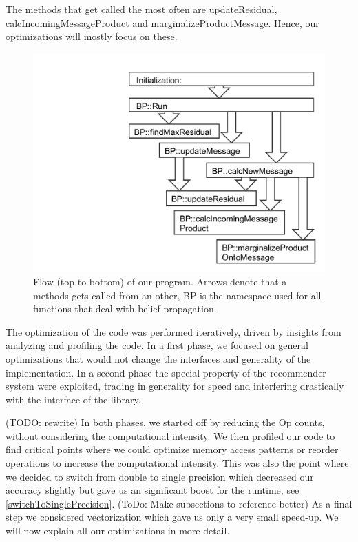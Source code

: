 
The methods that get called the most often are updateResidual, calcIncomingMessageProduct and marginalizeProductMessage. Hence, our optimizations will mostly focus on these.

\begin{figure}\centering
    \includegraphics[scale=0.5, trim={6.45cm 0cm 0 1.25cm},clip]{graphics/loopybp-compact.pdf}
  \caption{Flow (top to bottom) of our program. Arrows denote that a methods gets called from an other, BP is the namespace used for all functions that deal with belief propagation.\label{overviewflow}}
\end{figure}


The optimization of the code was performed iteratively, driven by insights from analyzing and profiling the code. In a first phase, we focused on general optimizations that would not change the interfaces and generality of the implementation. In a second phase the special property of the recommender system were exploited, trading in generality for speed and interfering drastically with the interface of the library.

(TODO: rewrite) 
In both phases, we started off by reducing the Op counts, without considering the computational intensity. We then profiled our code to find critical points where we could optimize memory access patterns or reorder operations to increase the computational intensity. This was also the point where we decided to switch from double to single precision which decreased our accuracy slightly but gave us an significant boost for the runtime, see \ref{switchToSinglePrecision}. (ToDo: Make subsections to reference better)
As a final step we considered vectorization which gave us only a very small speed-up. We will now explain all our optimizations in more detail.

